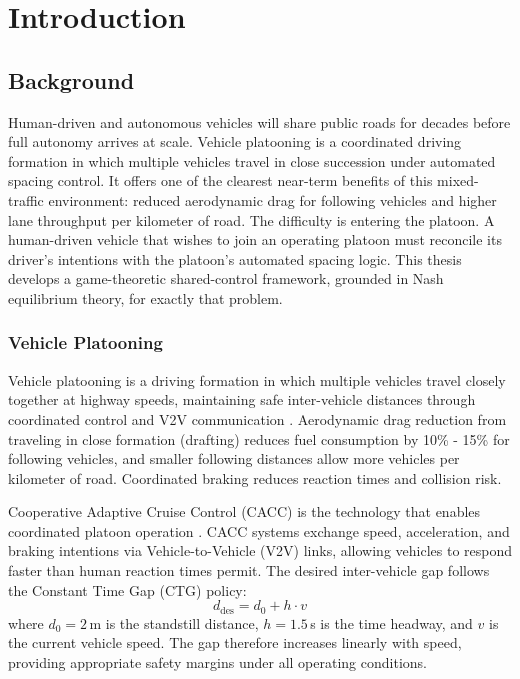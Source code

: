 \documentclass[12pt,a4paper,oneside]{report}
\begin{document}


\chapter{Introduction}

\section{Background}

Human-driven and autonomous vehicles will share public roads for decades before full autonomy arrives at scale. Vehicle platooning is a coordinated driving formation in which multiple vehicles travel in close succession under automated spacing control. It offers one of the clearest near-term benefits of this mixed-traffic environment: reduced aerodynamic drag for following vehicles and higher lane throughput per kilometer of road. The difficulty is entering the platoon. A human-driven vehicle that wishes to join an operating platoon must reconcile its driver's intentions with the platoon's automated spacing logic. This thesis develops a game-theoretic shared-control framework, grounded in Nash equilibrium theory, for exactly that problem.


\subsection{Vehicle Platooning}

Vehicle platooning is a driving formation in which multiple vehicles travel closely together at highway speeds, maintaining safe inter-vehicle distances through coordinated control and V2V communication \cite{treiberTrafficFlowDynamics2013}. Aerodynamic drag reduction from traveling in close formation (drafting) reduces fuel consumption by 10\% - 15\% for following vehicles, and smaller following distances allow more vehicles per kilometer of road. Coordinated braking reduces reaction times and collision risk.


Cooperative Adaptive Cruise Control (CACC) is the technology that enables coordinated platoon operation \cite{rajamaniVehicleDynamicsControl2005}. CACC systems exchange speed, acceleration, and braking intentions via Vehicle-to-Vehicle (V2V) links, allowing vehicles to respond faster than human reaction times permit. The desired inter-vehicle gap follows the Constant Time Gap (CTG) policy:
\begin{equation}
d_{\text{des}} = d_0 + h \cdot v
\label{eq:ctg_spacing_v2}
\end{equation}
where $d_0 = 2$\,m is the standstill distance, $h = 1.5$\,s is the time headway, and $v$ is the current vehicle speed. The gap therefore increases linearly with speed, providing appropriate safety margins under all operating conditions.
\end{document}
